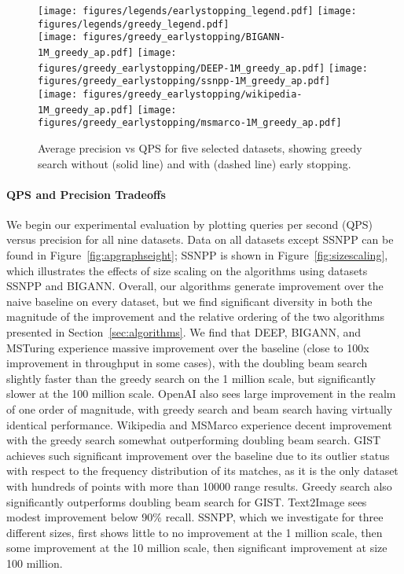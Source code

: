 \begin{figure*}
	\centering
	\texttt{[image: figures/legends/earlystopping\_legend.pdf]}
	\texttt{[image: figures/legends/greedy\_legend.pdf]} \\
	\texttt{[image: figures/greedy\_earlystopping/BIGANN-1M\_greedy\_ap.pdf]}
	\texttt{[image: figures/greedy\_earlystopping/DEEP-1M\_greedy\_ap.pdf]}
	\texttt{[image: figures/greedy\_earlystopping/ssnpp-1M\_greedy\_ap.pdf]}
	\texttt{[image: figures/greedy\_earlystopping/wikipedia-1M\_greedy\_ap.pdf]}
	\texttt{[image: figures/greedy\_earlystopping/msmarco-1M\_greedy\_ap.pdf]}
	\caption{Average precision vs QPS for five selected datasets, showing greedy search without (solid line) and with (dashed line) early stopping.}
	\label{fig:earlystoppinggreedy}
\end{figure*}

\paragraph{QPS and Precision Tradeoffs} We begin our experimental evaluation by plotting queries per second (QPS) versus precision for all nine datasets. Data on all datasets except SSNPP can be found in Figure~\ref{fig:apgraphseight}; SSNPP is shown in Figure~\ref{fig:sizescaling}, which illustrates the effects of size scaling on the algorithms using datasets SSNPP and BIGANN. Overall, our algorithms generate improvement over the naive baseline on every dataset, but we find significant diversity in both the magnitude of the improvement and the relative ordering of the two algorithms presented in Section~\ref{sec:algorithms}. We find that DEEP, BIGANN, and MSTuring experience massive improvement over the baseline (close to 100x improvement in throughput in some cases), with the doubling beam search slightly faster than the greedy search on the 1 million scale, but significantly slower at the 100 million scale. OpenAI also sees large improvement in the realm of one order of magnitude, with greedy search and beam search having virtually identical performance. Wikipedia and MSMarco experience decent improvement with the greedy search somewhat outperforming doubling beam search. GIST achieves such significant improvement over the baseline due to its outlier status with respect to the frequency distribution of its matches, as it is the only dataset with hundreds of points with more than 10000 range results. Greedy search also significantly outperforms doubling beam search for GIST. Text2Image sees modest improvement below 90\% recall. SSNPP, which we investigate for three different sizes, first shows little to no improvement at the 1 million scale, then some improvement at the 10 million scale, then significant improvement at size 100 million.

